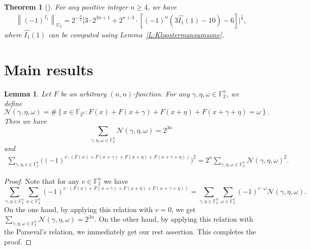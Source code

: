 \documentclass[12 pt]{article}
\newtheorem{theorem}{Theorem}
\newtheorem{lemma}{Lemma}
\def\F{{\mathbb F}}
\begin{document}
{\begin{theorem}[\cite{InverseFuncDAM2021}]\label{T:FFTSolution}
For any positive integer {$n\geq 4$}, we have
\begin{eqnarray*}
\left\| (-1)^{I_1}\right\| _{U_3}=2^{-{\frac n2}}\bigg|3\cdot2^{3n+1}+2^{n+3}\cdot\left[(-1)^n\left(3\widehat{I_1}(1)-10\right)-6\right]\bigg|^{\frac 18},
\end{eqnarray*}
where $\widehat{I_1}(1)$ can be computed using Lemma~\ref{L:Kloostermansumsone}.
\end{theorem}
\section{Main results}
\begin{lemma}\label{L:SumSqur}
Let $F$ be an arbitrary $(n, n)$-function. For any $\gamma,\eta,\omega\in\F_2^n$, we define
\begin{equation*}
\mathcal{N}(\gamma,\eta,\omega)=\#\left\{x\in\F_{2^n} : F(x)+F(x+\gamma)+F(x+\eta)+F(x+\gamma+\eta)=\omega\right\}.
\end{equation*}
Then we have
\begin{equation*}
 \sum_{\gamma,\eta,\omega\in\F_2^n}\mathcal{N}(\gamma,\eta,\omega)=2^{3n}
\end{equation*}
 and
\begin{eqnarray*}
\sum_{\gamma,\eta,v \in\F_2^n}\Big((-1)^{v\cdot\left(F(x)+F(x+\gamma)+F(x+\eta)+F(x+\gamma+\eta)\right)}\Big)^2=2^n\sum_{\gamma,\eta,\omega\in\F_2^n}\mathcal{N}(\gamma,\eta,\omega)^2.
\end{eqnarray*}
\end{lemma}
\begin{proof}
Note that for any $v\in\F_2^n$ we have $$\sum_{\gamma,\eta\in\F_2^n}\sum_{x \in \F_2^n}(-1)^{v \cdot(F(x)+F(x+\gamma)+F(x+\eta)+F(x+\gamma+\eta))} =\sum_{\gamma,\eta\in\F_2^n}\sum_{\omega \in \F_2^n}(-1)^{v \cdot \omega}\mathcal{N}(\gamma,\eta,\omega).$$
On the one hand, by applying this relation with $v=0$, we get  $\sum_{\gamma,\eta,\omega\in\F_2^n}\mathcal{N}(\gamma,\eta,\omega)=2^{3n}$.  On the other hand,
 by applying this relation with the Parseval's relation, we immediately get our rest assertion. This completes the proof.
\end{proof}

}
\end{document}
